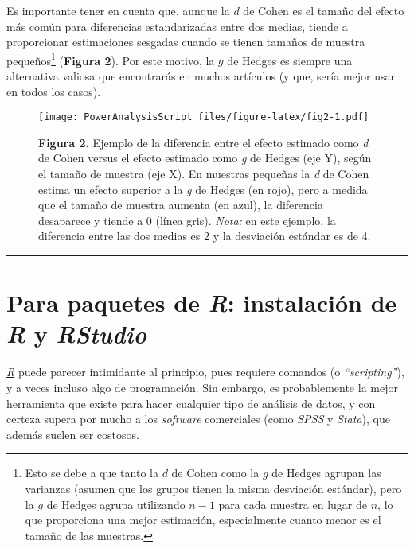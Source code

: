 \documentclass[
]{article}
\begin{document}
Es importante tener en cuenta que, aunque la \(d\) de Cohen es el tamaño
del efecto más común para diferencias estandarizadas entre dos medias,
tiende a proporcionar estimaciones sesgadas cuando se tienen tamaños de
muestra pequeños\footnote{Esto se debe a que tanto la \(d\) de Cohen
  como la \(g\) de Hedges agrupan las varianzas (asumen que los grupos
  tienen la misma desviación estándar), pero la \(g\) de Hedges agrupa
  utilizando \(n - 1\) para cada muestra en lugar de \(n\), lo que
  proporciona una mejor estimación, especialmente cuanto menor es el
  tamaño de las muestras.} (\textbf{Figura 2}). Por este motivo, la
\(g\) de Hedges es siempre una alternativa valiosa que encontrarás en
muchos artículos (y que, sería mejor usar en todos los casos).

\begin{figure}
\centering
\texttt{[image: PowerAnalysisScript\_files/figure-latex/fig2-1.pdf]}
\caption{\textbf{Figura 2.} Ejemplo de la diferencia entre el efecto
estimado como \emph{d} de Cohen versus el efecto estimado como \emph{g}
de Hedges (eje Y), según el tamaño de muestra (eje X). En muestras
pequeñas la \emph{d} de Cohen estima un efecto superior a la \emph{g} de
Hedges (en rojo), pero a medida que el tamaño de muestra aumenta (en
azul), la diferencia desaparece y tiende a 0 (línea gris). \emph{Nota:}
en este ejemplo, la diferencia entre las dos medias es 2 y la desviación
estándar es de 4.}
\end{figure}

\begin{center}\rule{0.5\linewidth}{0.5pt}\end{center}

\hypertarget{para-paquetes-de-r-instalaciuxf3n-de-r-y-rstudio}{%
\section{\texorpdfstring{Para paquetes de \emph{R}: instalación de
\emph{R} y
\emph{RStudio}}{Para paquetes de R: instalación de R y RStudio}}\label{para-paquetes-de-r-instalaciuxf3n-de-r-y-rstudio}}

\href{https://www.r-project.org/}{\emph{R}} puede parecer intimidante al
principio, pues requiere comandos (o \emph{``scripting''}), y a veces
incluso algo de programación. Sin embargo, es probablemente la mejor
herramienta que existe para hacer cualquier tipo de análisis de datos, y
con certeza supera por mucho a los \emph{software} comerciales (como
\emph{SPSS} y \emph{Stata}), que además suelen ser costosos.
\end{document}
